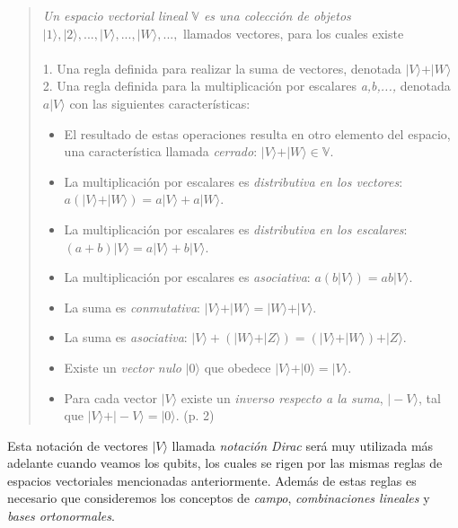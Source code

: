 \documentclass[11pt,a4paper]{article}
\begin{document}
\begin{quote}
\textit{Un espacio vectorial lineal $\mathbb{V}$ es una colección de objetos} $\vert1\rangle,\vert2\rangle,...,\vert V\rangle,...,\vert W\rangle,...,$ llamados vectores, para los cuales existe
\\\\
1. Una regla definida para realizar la suma de vectores, denotada $\vert V\rangle+\vert W\rangle$
\\2. Una regla definida para la multiplicación por escalares \textit{a,b,...,} denotada $a\vert V\rangle$ con las siguientes características:
\\
\begin{itemize}
\item El resultado de estas operaciones resulta en otro elemento del espacio, una característica llamada \textit{cerrado}: $\vert V\rangle+ \vert W\rangle\in\mathbb{V}$.
\item La multiplicación por escalares es \textit{distributiva en los vectores}: $a(\vert V\rangle+\vert W\rangle)=a\vert V\rangle+a\vert W\rangle$.
\item La multiplicación por escalares es \textit{distributiva en los escalares}: $(a+b)\vert V\rangle=a\vert V\rangle+b\vert V\rangle$.
\item La multiplicación por escalares es \textit{asociativa}: $a(b\vert V\rangle)=ab\vert V\rangle$.
\item La suma es \textit{conmutativa}: $\vert V\rangle+\vert W\rangle=\vert W\rangle+\vert V\rangle$.
\item La suma es \textit{asociativa}: $\vert V\rangle+(\vert W\rangle+\vert Z\rangle)=(\vert V\rangle+\vert W\rangle)+\vert Z\rangle$.
\item Existe un \textit{vector nulo} $\vert 0\rangle$ que obedece $\vert V\rangle+\vert 0\rangle=\vert V\rangle$.
\item Para cada vector $\vert V\rangle$ existe un \textit{inverso respecto a la suma}, $\vert -V\rangle$, tal que $\vert V\rangle+\vert -V\rangle=\vert 0\rangle$. (p. 2)
\end{itemize}
\end{quote}

Esta notación de vectores $\vert V\rangle$ llamada \textit{notación Dirac} será muy utilizada más adelante cuando veamos los qubits, los cuales se rigen por las mismas reglas de espacios vectoriales mencionadas anteriormente. Además de estas reglas es necesario que consideremos los conceptos de \textit{campo}, \textit{combinaciones lineales} y \textit{bases ortonormales}.
\end{document}
